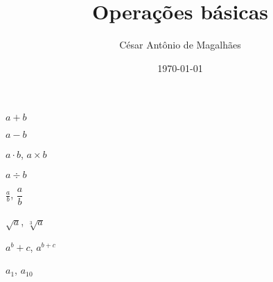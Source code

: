 \documentclass[12pt,a4paper]{article}
\title{Operações básicas}
\author{César Antônio de Magalhães}
\date{\today}
\begin{document}
	$a + b$
	
	$a  - b$
	
	$a \cdot b$, $a \times b$
	
	$a \div b$
	
	$\frac{a}{b}$, $\dfrac{a}{b}$
	
	$\sqrt{a}$, $\sqrt[3]{a}$
	
	$a^b+c$, $a^{b + c}$
	
	$a_1$, $a_{10}$
\end{document}
